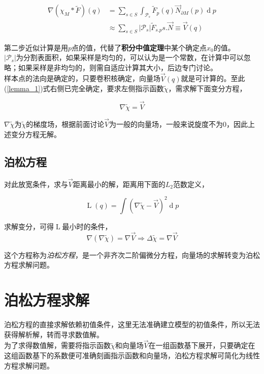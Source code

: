 \begin{align}
	\nabla (\chi_M * \tilde{F})(q) &= \sum_{s \in S}\int_{\mathcal{P}_s}\tilde{F}_p(q)\overrightarrow{N}_{\partial M}(p)\mathop{d}p\\
	&\approx \sum_{s \in S}|\mathcal{P}_s|\tilde{F}_{s.p}s.\overrightarrow{N} \equiv \overrightarrow{V}(q) \label{vector_field}
\end{align}

第二步近似计算是用$p$点的值，代替了\textbf{积分中值定理}中某个确定点$x_0$的值。\\

$|\mathcal{P}_s|$为分割表面积，如果采样是均匀的，可以认为是一个常数，在计算中可以忽略；如果采样是非均匀的，则需自适应计算其大小，后边专门讨论。\\

样本点的法向是确定的，只要卷积核确定，向量场$\overrightarrow{V}(q)$就是可计算的。至此(\ref{lemma_1})式右侧已完全确定，要求左侧指示函数$\tilde{\chi}$，需求解下面变分方程，

$$
\nabla \tilde{\chi} = \overrightarrow{V}
$$

$\nabla \tilde{\chi}$为$\tilde{\chi}$的梯度场，根据前面讨论$\overrightarrow{V}$为一般的向量场，一般来说旋度不为0，因此上述变分方程无解。

\subsection*{泊松方程}

对此放宽条件，求与$\overrightarrow{V}$距离最小的解，距离用下面的$L_2$范数定义，

$$
	\mathop{L}(q) = \int \left(\nabla\tilde{\chi} - \overrightarrow{V}\right)^2 \mathop{d}p
$$

求解变分，可得$\mathop{L}$最小时的条件，
$$
	\nabla(\nabla \tilde{\chi}) = \nabla\overrightarrow{V} \Rightarrow \Delta \tilde{\chi} = \nabla\overrightarrow{V}
$$

这个方程称为\textit{泊松方程}，是一个非齐次二阶偏微分方程，向量场的求解转变为泊松方程求解问题。

\section{泊松方程求解}

	泊松方程的直接求解依赖初值条件，这里无法准确建立模型的初值条件，所以无法获得解析解，转而寻求数值解。\\

	为了求得数值解，需要将指示函数$\tilde{\chi}$和向量场$\overrightarrow{V}$在一组函数基下展开，只要确定在这组函数基下的系数便可准确刻画指示函数和向量场，泊松方程求解可简化为线性方程求解问题。

